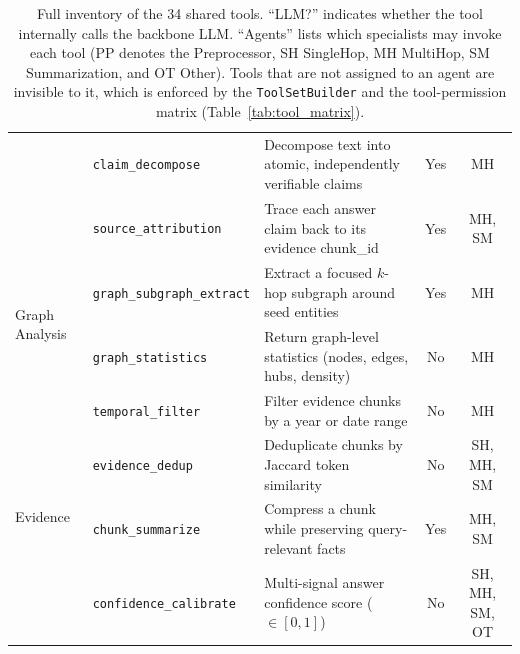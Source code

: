 \documentclass[11pt,a4paper]{article}
\newcommand{\tool}[1]{\texttt{\small #1}}
\begin{document}
\begin{table}[t]
\begin{tabular}{@{}lllcc@{}}
  & \tool{claim\_decompose}      & Decompose text into atomic, independently verifiable claims & Yes & MH \\
  & \tool{source\_attribution}   & Trace each answer claim back to its evidence chunk\_id     & Yes & MH, SM \\
\midrule
\multirow{2}{*}{Graph Analysis}
  & \tool{graph\_subgraph\_extract} & Extract a focused $k$-hop subgraph around seed entities   & Yes & MH \\
  & \tool{graph\_statistics}     & Return graph-level statistics (nodes, edges, hubs, density)& No  & MH \\
\midrule
\multirow{4}{*}{Evidence}
  & \tool{temporal\_filter}      & Filter evidence chunks by a year or date range                  & No  & MH \\
  & \tool{evidence\_dedup}       & Deduplicate chunks by Jaccard token similarity             & No  & SH, MH, SM \\
  & \tool{chunk\_summarize}      & Compress a chunk while preserving query-relevant facts     & Yes & MH, SM \\
  & \tool{confidence\_calibrate} & Multi-signal answer confidence score ($\in[0,1]$)          & No  & SH, MH, SM, OT \\
\bottomrule
\end{tabular}
\caption{Full inventory of the 34 shared tools. ``LLM?'' indicates whether the tool internally calls the backbone LLM. ``Agents'' lists which specialists may invoke each tool (PP denotes the Preprocessor, SH SingleHop, MH MultiHop, SM Summarization, and OT Other). Tools that are not assigned to an agent are invisible to it, which is enforced by the \texttt{ToolSetBuilder} and the tool-permission matrix (Table~\ref{tab:tool_matrix}).}
\label{tab:tool_full}
\end{table}
\end{document}
